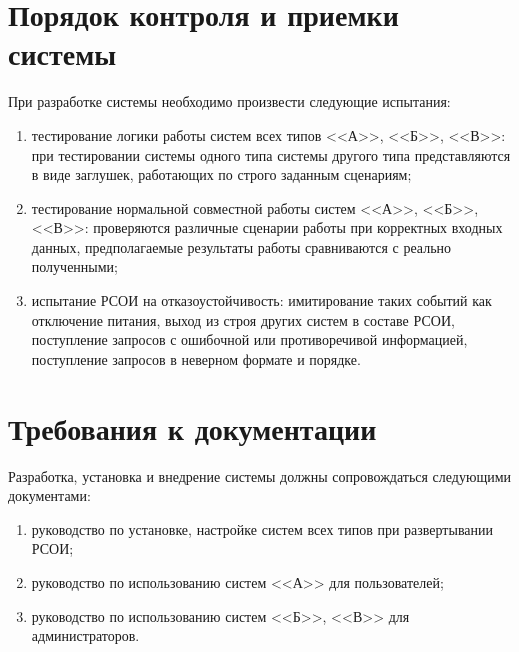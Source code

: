 \section{Порядок контроля и приемки системы}
При разработке системы необходимо произвести следующие испытания:
\begin{enumerate}
	\item тестирование логики работы систем всех типов <<А>>, <<Б>>, <<В>>: при тестировании системы одного типа системы другого типа представляются в виде заглушек, работающих по строго заданным сценариям;
	\item тестирование нормальной совместной работы систем <<А>>, <<Б>>, <<В>>: проверяются различные сценарии работы при корректных входных данных, предполагаемые результаты работы сравниваются с реально полученными;
	\item испытание РСОИ на отказоустойчивость: имитирование таких событий как отключение питания, выход из строя других систем в составе РСОИ, поступление запросов с ошибочной или противоречивой информацией, поступление запросов в неверном формате и порядке.
\end{enumerate}


\section{Требования к документации}
Разработка, установка и внедрение системы должны сопровождаться следующими документами:

\begin{enumerate}
	\item руководство по установке, настройке систем всех типов при развертывании РСОИ;
	\item руководство по использованию систем <<А>> для пользователей;
	\item руководство по использованию систем <<Б>>, <<В>> для администраторов.
\end{enumerate}


























